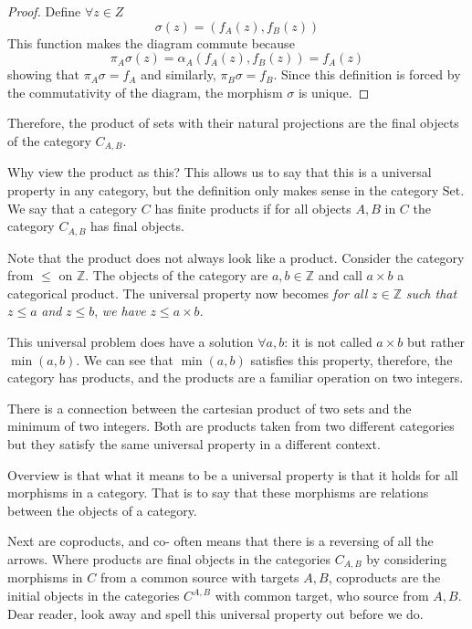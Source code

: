 \documentclass{report}
\begin{document}
\begin{proof}
    Define $\forall z \in Z$
        \begin{equation*}
            \sigma(z) = (f_{A}(z), f_{B}(z))
        \end{equation*}
    This function makes the diagram commute because
        \begin{equation*}
            \pi_{A}\sigma(z) = \alpha_{A}(f_{A}(z), f_{B}(z)) = f_{A}(z)
        \end{equation*}
    showing that $\pi_{A}\sigma = f_{A}$ and similarly, $\pi_{B}\sigma = f_{B}$. Since this definition is forced by the commutativity of the diagram, the morphism $\sigma$ is unique.
\end{proof}
Therefore, the product of sets with their natural projections are the final objects of the category $C_{A, B}$.

Why view the product as this? This allows us to say that this is a universal property in any category, but the definition only makes sense in the category $\text{Set}$. We say that a category $C$ has finite products if for all objects $A, B$ in $C$ the category $C_{A, B}$ has final objects.

Note that the product does not always look like a product. Consider the category from $\leq $ on $\mathbb{Z}$. The objects of the category are $a, b \in \mathbb{Z}$ and call $a \times b$ a categorical product. The universal property now becomes \textit{for all} $z \in \mathbb{Z}$ \textit{such that} $z \leq a$ \textit{and} $z \leq b$, \textit{we have} $z \leq a \times b$.

This universal problem does have a solution $\forall a, b$: it is not called $a \times b$ but rather $\min(a, b)$. We can see that $\min(a, b)$ satisfies this property, therefore, the category has products, and the products are a familiar operation on two integers.

There is a connection between the cartesian product of two sets and the minimum of two integers. Both are products taken from two different categories but they satisfy the same universal property in a different context.

Overview is that what it means to be a universal property is that it holds for all morphisms in a category. That is to say that these morphisms are relations between the objects of a category.

Next are coproducts, and co- often means that there is a reversing of all the arrows. Where products are final objects in the categories $C_{A, B}$ by considering morphisms in $C$ from a common source with targets $A, B$, coproducts are the initial objects in the categories $C^{A, B}$ with common target, who source from $A, B$. Dear reader, look away and spell this universal property out before we do.
\end{document}
